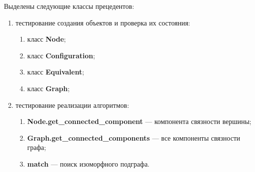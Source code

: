 Выделены следующие классы прецедентов:
\begin{enumerate}
    \item тестирование создания объектов и проверка их состояния:
    \begin{enumerate}
        \item класс \textbf{Node};
        \item класс \textbf{Configuration};
        \item класс \textbf{Equivalent};
        \item класс \textbf{Graph};
    \end{enumerate}
    \item тестирование реализации алгоритмов:
    \begin{enumerate}
        \item \textbf{Node.get\_connected\_component} --- компонента связности вершины;
        \item \textbf{Graph.get\_connected\_components} --- все компоненты связности графа;
        \item \textbf{match} --- поиск изоморфного подграфа.
    \end{enumerate}
\end{enumerate}

